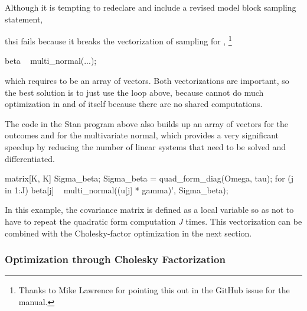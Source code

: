 Although it is tempting to redeclare  and include a revised
model block sampling statement,
%
\begin{stancode}
parameters {
  matrix[J, K] beta;
...
model {
  y ~ normal(rows_dot_product(x, beta[jj]), sigma);
  ...
\end{stancode}
%
thsi fails because it breaks the vectorization of sampling for
,%
%
\footnote{Thanks to Mike Lawrence for pointing this out in the GitHub
  issue for the manual.}
%
\begin{stancode}
  beta ~ multi_normal(...);
\end{stancode}
%
which requires  to be an array of vectors.  Both
vectorizations are important, so the best solution is to just use the
loop above, because  cannot do much
optimization in and of itself because there are no shared computations.

The code in the Stan program above also builds up an array of vectors
for the outcomes and for the multivariate normal, which provides a
very significant speedup by reducing the number of linear systems that
need to be solved and differentiated.  
%
\begin{stancode}
  {
    matrix[K, K] Sigma_beta;
    Sigma_beta = quad_form_diag(Omega, tau);
    for (j in 1:J)
      beta[j] ~ multi_normal((u[j] * gamma)', Sigma_beta);
  }
\end{stancode}
%
In this example, the covariance matrix  is defined
as a local variable so as not to have to repeat the quadratic form
computation $J$ times.  This vectorization can be combined with the
Cholesky-factor optimization in the next section.

\subsubsection{Optimization through Cholesky Factorization}


